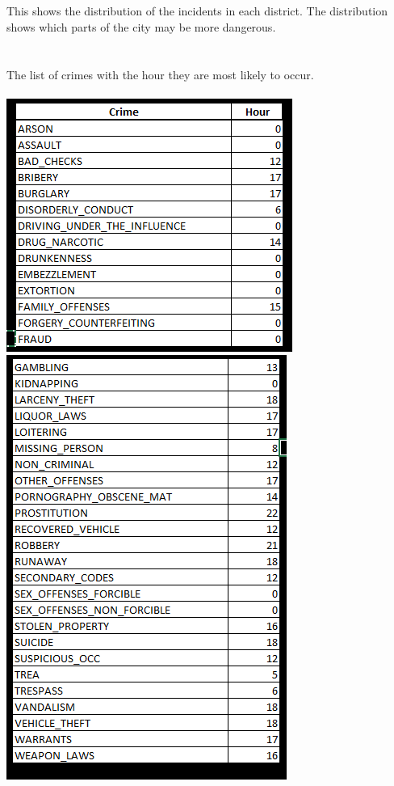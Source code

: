 \documentclass[paper=a4, fontsize=11pt]{scrartcl} %
\numberwithin{equation}{section} %
\numberwithin{figure}{section} %
\numberwithin{table}{section} %
\begin{document}
	\\\\
	This shows the distribution of the incidents in each district. The distribution shows which parts of the city may be more dangerous. 
	\\\\\\
	The list of crimes with the hour they are most likely to occur.\\\\
	\hspace*{3.5cm}\includegraphics{crimes_hours}
	\\
	\hspace*{3.5cm}\includegraphics{crimes_hours_2}
\end{document}

